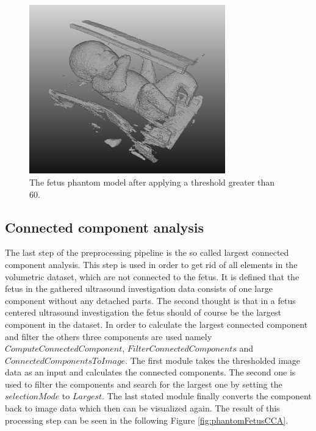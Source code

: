 \begin{figure} [!htb]
    \centering
	\includegraphics[width=8.5cm]{content/images/phantomFetusTh}
	\caption{The fetus phantom model after applying a threshold greater than 60.} 
	\label{fig:phantomFetusTh}
\end{figure}

\subsection{Connected component analysis}

The last step of the preprocessing pipeline is the so called largest connected component analysis. This step is used in order to get rid of all elements in the volumetric dataset, which are not connected to the fetus. It is defined that the fetus in the gathered ultrasound investigation data consists of one large component without any detached parts. The second thought is that in a fetus centered ultrasound investigation the fetus should of course be the largest component in the dataset. In order to calculate the largest connected component and filter the others three components are used namely $ComputeConnectedComponent$, $FilterConnectedComponents$ and $ConnectedComponentsToImage$. The first module takes the thresholded image data as an input and calculates the connected components. The second one is used to filter the components and search for the largest one by setting the $selectionMode$ to $Largest$. The last stated module finally converts the component back to image data which then can be visualized again. The result of this processing step can be seen in the following Figure \ref{fig:phantomFetusCCA}.

